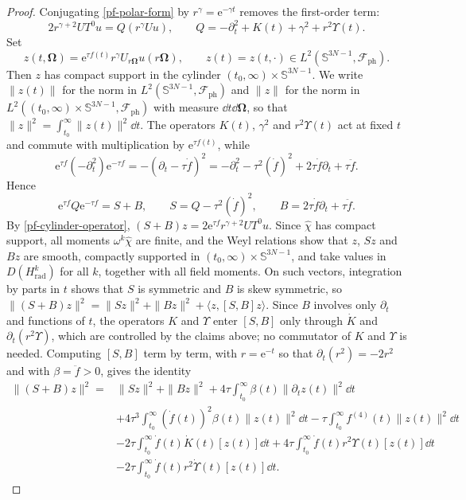 \documentclass[final,reqno]{amsart}
\theoremstyle{remark}
\newcommand{\e}{\mathrm{e}}
\newcommand{\dua}[2]{\langle #1, #2 \rangle}
\newcommand{\DC}{D}
\newcommand{\ph}{\mathrm{ph}}
\newcommand{\rad}{\mathrm{rad}}
\newcommand{\Fock}{\mathcal{F}}
\newcommand{\vOmega}{{\bm{\Omega}}}
\newcommand{\wh}[1]{\widehat{#1}}
\begin{document}
\begin{proof}
Conjugating \cref{pf-polar-form} by $r^\gamma=\e^{-\gamma t}$ removes the
first-order term:
\begin{equation}\label{pf-cylinder-operator}
 2r^{\gamma+2}UT^0u=Q(r^\gamma Uu),
 \qquad
 Q=-\partial_t^2+K(t)+\gamma^2+r^2\Upsilon(t).
\end{equation}
Set
\[
 z(t,\vOmega)=\e^{\tau f(t)}r^\gamma U_{r\vOmega}u(r\vOmega),\qquad
 z(t)=z(t,\cdot)\in L^2(\mathbb S^{3N-1},\Fock_\ph).
\]
Then $z$ has compact support in the cylinder
$(t_0,\infty)\times\mathbb S^{3N-1}$.  We write $\|z(t)\|$ for the norm in $L^2(\mathbb S^{3N-1},\Fock_\ph)$ and
$\|z\|$ for the norm in $L^2((t_0,\infty)\times\mathbb S^{3N-1},\Fock_\ph)$
with measure $\dd t\dd\vOmega$, so that
$\|z\|^2=\int_{t_0}^\infty\|z(t)\|^2\dd t$.  The operators $K(t)$, $\gamma^2$
and $r^2\Upsilon(t)$ act at fixed $t$ and commute with multiplication by
$\e^{\tau f(t)}$, while
\[
 \e^{\tau f}(-\partial_t^2)\e^{-\tau f}=-(\partial_t-\tau\dot f)^2
 =-\partial_t^2-\tau^2(\dot f)^2+2\tau\dot f\partial_t+\tau\ddot f.
\]
Hence
\[
 \e^{\tau f}Q\e^{-\tau f}=S+B,
 \qquad
 S=Q-\tau^2(\dot f)^2,
 \qquad B=2\tau\dot f\partial_t+\tau\ddot f.
\]
By \cref{pf-cylinder-operator}, $(S+B)z=2\e^{\tau f}r^{\gamma+2}UT^0u$.
Since $\wh\chi$ has compact support, all moments $\omega^k\wh\chi$ are
finite, and the Weyl relations show that $z$, $Sz$ and $Bz$ are smooth,
compactly supported in $(t_0,\infty)\times\mathbb S^{3N-1}$, and take
values in $\DC(H_\rad^k)$ for all $k$, together with all field moments.
On such vectors, integration by parts in $t$ shows that $S$ is
symmetric and $B$ is skew symmetric, so
$\|(S+B)z\|^2=\|Sz\|^2+\|Bz\|^2+\dua{z}{[S,B]z}$.  Since $B$ involves
only $\partial_t$ and functions of $t$, the operators $K$ and $\Upsilon$
enter $[S,B]$ only through $\dot K$ and $\partial_t(r^2\Upsilon)$, which are
controlled by the claims above; no commutator of $K$ and $\Upsilon$ is
needed.  Computing $[S,B]$
term by term, with $r=\e^{-t}$ so that $\partial_t(r^2)=-2r^2$ and with
$\beta=\ddot f>0$, gives the
 identity
\begin{align}
 \|(S+B)z\|^2
 ={}&\|Sz\|^2+\|Bz\|^2
      +4\tau\int_{t_0}^\infty\beta(t)\|\partial_tz(t)\|^2\dd t
       \nonumber\\
 &+4\tau^3\int_{t_0}^\infty(\dot f(t))^2\beta(t)\|z(t)\|^2\dd t
      -\tau\int_{t_0}^\infty f^{(4)}(t)\|z(t)\|^2\dd t
       \nonumber\\
 &-2\tau\int_{t_0}^\infty\dot f(t)\dot K(t)[z(t)]\dd t
      +4\tau\int_{t_0}^\infty\dot f(t)r^2\Upsilon(t)[z(t)]\dd t
       \nonumber\\
 &-2\tau\int_{t_0}^\infty\dot f(t)r^2\dot\Upsilon(t)[z(t)]\dd t.
 \label{pf-cylinder-commutator}
\end{align}


\end{proof}
\end{document}
